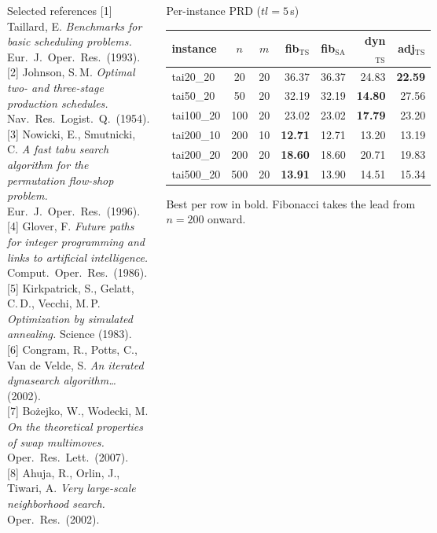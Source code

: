 \documentclass[final]{beamer}
\begin{document}
\begin{frame}
{\begin{columns}
\begin{block}{Selected references}
\vspace*{1mm}
{\small
[1] Taillard, E. \emph{Benchmarks for basic scheduling problems.}
    Eur.\ J.\ Oper.\ Res.\ (1993).\\[0.4ex]
[2] Johnson, S.\,M. \emph{Optimal two- and three-stage production
    schedules.} Nav.\ Res.\ Logist.\ Q.\ (1954).\\[0.4ex]
[3] Nowicki, E., Smutnicki, C. \emph{A fast tabu search algorithm for
    the permutation flow-shop problem.} Eur.\ J.\ Oper.\ Res.\ (1996).\\[0.4ex]
[4] Glover, F. \emph{Future paths for integer programming and links to
    artificial intelligence.} Comput.\ Oper.\ Res.\ (1986).\\[0.4ex]
[5] Kirkpatrick, S., Gelatt, C.\,D., Vecchi, M.\,P.
    \emph{Optimization by simulated annealing.} Science (1983).\\[0.4ex]
[6] Congram, R., Potts, C., Van de Velde, S.
    \emph{An iterated dynasearch algorithm\ldots} (2002).\\[0.4ex]
[7] Bo\.zejko, W., Wodecki, M. \emph{On the theoretical properties of
    swap multimoves.} Oper.\ Res.\ Lett.\ (2007).\\[0.4ex]
[8] Ahuja, R., Orlin, J., Tiwari, A. \emph{Very large-scale neighborhood
    search.} Oper.\ Res.\ (2002).
}
\vspace*{1mm}
\end{block}


\begin{block}{Per-instance PRD ($tl=5\,$s)}
\vspace*{2mm}
\begin{center}
\small
\begin{tabular}{lcc rr rr}
\toprule
instance & $n$ & $m$
  & fib$_{\mathrm{TS}}$ & fib$_{\mathrm{SA}}$
  & dyn$_{\mathrm{TS}}$ & adj$_{\mathrm{TS}}$ \\
\midrule
tai20\_20  & 20  & 20 & 36.37 & 36.37 & 24.83 & \textbf{22.59} \\
tai50\_20  & 50  & 20 & 32.19 & 32.19 & \textbf{14.80} & 27.56 \\
tai100\_20 & 100 & 20 & 23.02 & 23.02 & \textbf{17.79} & 23.20 \\
tai200\_10 & 200 & 10 & \textbf{12.71} & 12.71 & 13.20 & 13.19 \\
tai200\_20 & 200 & 20 & \textbf{18.60} & 18.60 & 20.71 & 19.83 \\
tai500\_20 & 500 & 20 & \textbf{13.91} & 13.90 & 14.51 & 15.34 \\
\bottomrule
\end{tabular}
\end{center}
\vspace*{1mm}
Best per row in bold. Fibonacci takes the lead from $n=200$ onward.
\vspace*{2mm}
\end{block}


\end{columns}}
\end{frame}
\end{document}
